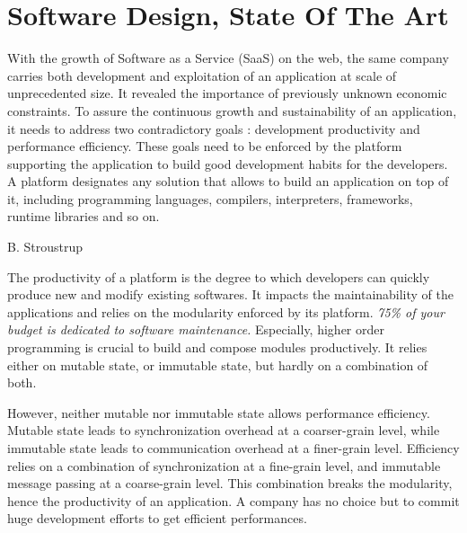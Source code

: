 \eject
\renewcommand{\glyph}{\linecons{\XeTeXglyph43}}
\chapter{Software Design, State Of The Art} \label{chapter3}
\eject


With the growth of Software as a Service (SaaS) on the web, the same company carries both development and exploitation of an application at scale of unprecedented size.
It revealed the importance of previously unknown economic constraints.
To assure the continuous growth and sustainability of an application, it needs to address two contradictory goals : development productivity and performance efficiency.
These goals need to be enforced by the platform supporting the application to build good development habits for the developers.
A platform designates any solution that allows to build an application on top of it, including programming languages, compilers, interpreters, frameworks, runtime libraries and so on.

%
{B. Stroustrup}


The productivity of a platform is the degree to which developers can quickly produce new and modify existing softwares.
It impacts the maintainability of the applications and relies on the modularity enforced by its platform.
\textit{75\% of your budget is dedicated to software maintenance.}
Especially, higher order programming is crucial to build and compose modules productively.
It relies either on mutable state, or immutable state, but hardly on a combination of both.

However, neither mutable nor immutable state allows performance efficiency.
Mutable state leads to synchronization overhead at a coarser-grain level, while immutable state leads to communication overhead at a finer-grain level.
Efficiency relies on a combination of synchronization at a fine-grain level, and immutable message passing at a coarse-grain level.
This combination breaks the modularity, hence the productivity of an application.
A company has no choice but to commit huge development efforts to get efficient performances.

